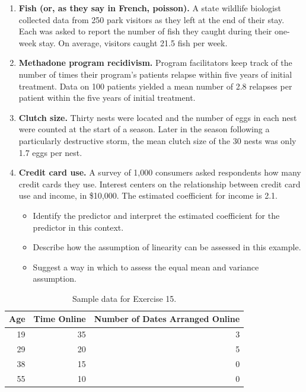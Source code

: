 \documentclass[
]{krantz}
\providecommand{\tightlist}{%
  \setlength{\itemsep}{0pt}\setlength{\parskip}{0pt}}
\begin{document}
\begin{enumerate}
\def\labelenumi{\arabic{enumi}.}
\setcounter{enumi}{10}
\item
  \textbf{Fish (or, as they say in French, poisson).} A state wildlife biologist collected data from 250 park visitors as they left at the end of their stay. Each was asked to report the number of fish they caught during their one-week stay. On average, visitors caught 21.5 fish per week.
\item
  \textbf{Methadone program recidivism.} Program facilitators keep track of the number of times their program's patients relapse within five years of initial treatment. Data on 100 patients yielded a mean number of 2.8 relapses per patient within the five years of initial treatment.
\item
  \textbf{Clutch size.} Thirty nests were located and the number of eggs in each nest were counted at the start of a season. Later in the season following a particularly destructive storm, the mean clutch size of the 30 nests was only 1.7 eggs per nest.
  \vspace{3mm}
\item
  \textbf{Credit card use.} A survey of 1,000 consumers asked respondents how many credit cards they use. Interest centers on the relationship between credit card use and income, in \$10,000. The estimated coefficient for income is 2.1.

  \begin{itemize}
  \tightlist
  \item
    Identify the predictor and interpret the estimated coefficient for the predictor in this context.
  \item
    Describe how the assumption of linearity can be assessed in this example.
  \item
    Suggest a way in which to assess the equal mean and variance assumption.
  \end{itemize}
\end{enumerate}

\begin{table}
\centering
\caption{\label{tab:tab2chp4}Sample data for Exercise 15.}
\centering
\begin{tabular}[t]{rrr}
\toprule
Age & Time Online & Number of Dates Arranged Online\\
\midrule
19 & 35 & 3\\
29 & 20 & 5\\
38 & 15 & 0\\
55 & 10 & 0\\
\bottomrule
\end{tabular}
\end{table}
\end{document}

